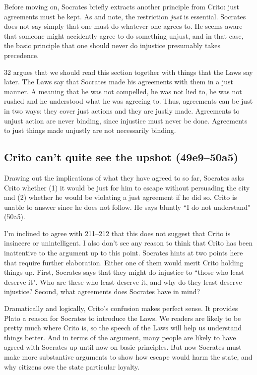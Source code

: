 \documentclass[11pt]{article}
\begin{document}
Before moving on, Socrates briefly extracts another principle from Crito: just
agreements must be kept.  As \citet{kraut1984} and \citet{brickhouse2004} note,
the restriction \emph{just} is essential.  Socrates does not say simply that
one must do whatever one agrees to.  He seems aware that someone might
accidently agree to do something unjust, and in that case, the basic principle
that one should never do injustice presumably takes precedence.

\citet{kraut1984} 32 argues that we should read this section together with
things that the Laws say later.  The Laws say that Socrates made his agreements
with them in a just manner.  A  meaning that he was not
compelled, he was not lied to, he was not rushed and he understood what he was
agreeing to.  Thus, agreements can be just in two ways: they cover just actions
and they are justly made.  Agreements to unjust action are never binding, since
injustice must never be done.  Agreements to just things made unjustly are not
necessarily binding.


\subsection{Crito can't quite see the upshot (49e9--50a5)}

Drawing out the implications of what they have agreed to so far, Socrates asks
Crito whether (1) it would be just for him to escape without persuading the
city and (2) whether he would be violating a just agreement if he did so.
Crito is unable to answer since he does not follow.  He says bluntly ``I do not
understand" (50a5).

I'm inclined to agree with \citet{brickhouse2004} 211--212 that this does not
suggest that Crito is insincere or unintelligent.  I also don't see any reason
to think that Crito has been inattentive to the argument up to this point.
Socrates hints at two points here that require further elaboration.  Either one
of them would merit Crito holding things up.  First, Socrates says that they
might do injustice to ``those who least deserve it". Who are these who least
deserve it, and why do they least deserve injustice?  Second, what agreements
does Socrates have in mind?

Dramatically and logically, Crito's confusion makes perfect sense.  It provides
Plato a reason for Socrates to introduce the Laws.  We readers are likely to be
pretty much where Crito is, so the speech of the Laws will help us understand
things better.  And in terms of the argument, many people are likely to have
agreed with Socrates up until now on basic principles.  But now Socrates must
make more substantive arguments to show how escape would harm the state, and
why citizens owe the state particular loyalty.
\end{document}
